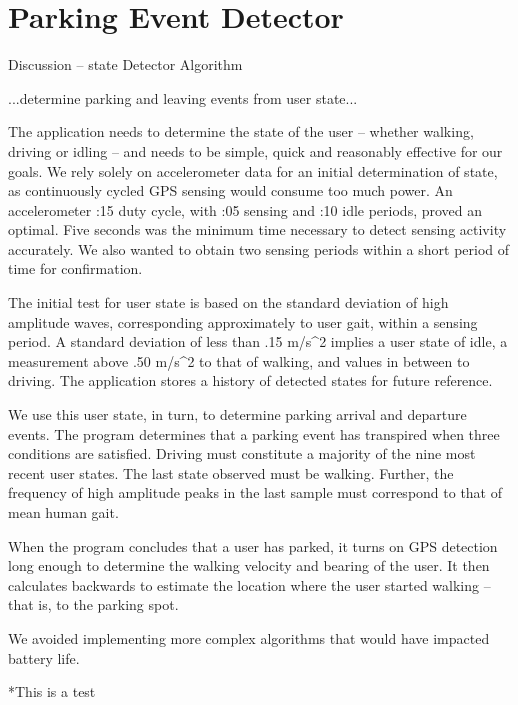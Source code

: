 \section{Parking Event Detector}
\label{sec-detector}

Discussion -- state Detector Algorithm

...determine parking and leaving events from user state...

The application needs to determine the state of the user -- whether walking, driving or idling – and needs to be simple, quick and reasonably effective for our goals.  We rely solely on accelerometer data for an initial determination of state, as continuously cycled GPS sensing would consume too much power.  An accelerometer :15 duty cycle, with :05 sensing and :10 idle periods, proved an optimal.  Five seconds was  the minimum time necessary to detect sensing activity accurately.  We also wanted to obtain two sensing periods within a short period of time for confirmation.

The initial test for user state is based on the standard deviation of high amplitude waves, corresponding approximately to user gait, within a sensing period.  A standard deviation of less than .15 m/s^2 implies a user state of idle, a measurement above .50 m/s^2 to that of walking, and values in between to driving.  The application stores a history of detected states for future reference.

We use this user state, in turn, to determine parking arrival and departure events.  The program determines that a parking event has transpired when three conditions are satisfied.  Driving must constitute a majority of the nine most recent user states.  The last state observed must be walking.  Further, the frequency of high amplitude peaks in the last sample must correspond to that of mean human gait.

When the program concludes that a user has parked, it turns on GPS detection long enough to determine the walking velocity and bearing of the user.  It then calculates backwards to estimate the location where the user started walking – that is, to the parking spot.



We avoided implementing more complex algorithms that would have impacted battery life.




*This is a test  


